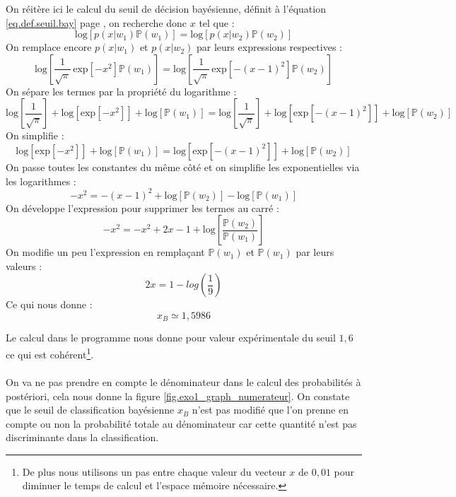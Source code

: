 \documentclass[11pt,a4paper]{article}
\begin{document}
On réitère ici le calcul du seuil de décision bayésienne, définit à l'équation \ref{eq.def.seuil.bay} page \pageref{eq.def.seuil.bay}, on recherche donc $x$ tel que :
$$
\text{log}\left[p(x|w_1)\mathbb{P}(w_1)\right] = \text{log}\left[p(x|w_2)\mathbb{P}(w_2)\right]
$$
On remplace encore $p(x|w_1)$ et $p(x|w_2)$ par leurs expressions respectives :
$$
\text{log}\left[\frac{1}{\sqrt{\pi}}\,\text{exp}\left[-x^2\right]\mathbb{P}(w_1)\right] = \text{log}\left[\frac{1}{\sqrt{\pi}}\,\text{exp}\left[-(x-1)^2\right]\mathbb{P}(w_2)\right]
$$
On sépare les termes par la propriété du logarithme :
$$
\text{log}\left[\frac{1}{\sqrt{\pi}}\right] + \text{log}\left[\text{exp}\left[-x^2\right]\right] + \text{log}\left[\mathbb{P}(w_1)\right] = \text{log}\left[\frac{1}{\sqrt{\pi}}\right] + \text{log}\left[\text{exp}\left[-(x-1)^2\right]\right] + \text{log}\left[\mathbb{P}(w_2)\right]
$$
On simplifie :
$$
\text{log}\left[\text{exp}\left[-x^2\right]\right] + \text{log}\left[\mathbb{P}(w_1)\right] = \text{log}\left[\text{exp}\left[-(x-1)^2\right]\right] + \text{log}\left[\mathbb{P}(w_2)\right]
$$
On passe toutes les constantes du même côté et on simplifie les exponentielles via les logarithmes :
$$
-x^2 = -(x-1)^2 + \text{log}\left[\mathbb{P}(w_2)\right] - \text{log}\left[\mathbb{P}(w_1)\right]
$$
On développe l'expression pour supprimer les termes au carré :
$$
-x^2 = -x^2 + 2x - 1 + \text{log}\left[\frac{\mathbb{P}(w_2)}{\mathbb{P}(w_1)}\right]
$$
On modifie un peu l'expression en remplaçant $\mathbb{P}(w_1)$ et $\mathbb{P}(w_1)$ par leurs valeurs :
$$
2x =  1 - log\left(\frac{1}{9}\right)
$$
Ce qui nous donne :
$$
x_B \simeq 1,5986
$$

Le calcul dans le programme nous donne pour valeur expérimentale du seuil $1,6$ ce qui est cohérent\footnote{De plus nous utilisons un pas entre chaque valeur du vecteur $x$ de $0,01$ pour diminuer le temps de calcul et l'espace mémoire nécessaire.}.
\\ \\
On va ne pas prendre en compte le dénominateur dans le calcul des probabilités à postériori, cela nous donne la figure \ref{fig.exo1_graph_numerateur}. On constate que le seuil de classification bayésienne $x_B$ n'est pas modifié que l'on prenne en compte ou non la probabilité totale au dénominateur car cette quantité n'est pas discriminante dans la classification.
\end{document}
